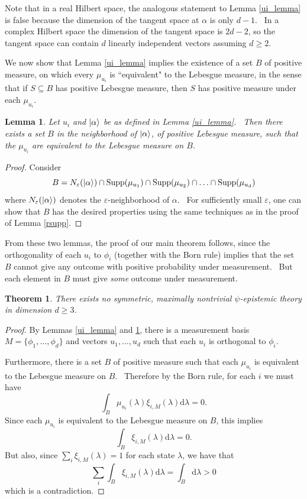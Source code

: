\documentclass[letterpaper,11pt]{article}
\newtheorem{lem}{Lemma}
\newtheorem{thm}{Theorem}
\newcommand{\ket}[1]{\mbox{$ | #1 \rangle $}}
\DeclareMathOperator{\supp}{Supp}
\begin{document}
Note that in a real Hilbert space, the analogous statement to Lemma \ref{ui_lemma} is false because the dimension of the tangent space at $\alpha$ is only $d-1$. \ In a complex Hilbert space the dimension of the tangent space is $2d-2$, so the tangent space can contain $d$ linearly independent vectors assuming $d\geq 2$.

We now show that Lemma \ref{ui_lemma} implies the existence of a set $B$ of positive measure, on which every $\mu_{u_i}$ is ``equivalent" to the Lebesgue measure, in the sense that if $S\subseteq B$ has positive Lebesgue measure, then $S$ has positive measure under each $\mu_{u_i}$.

\begin{lem}
\label{lem_product_measure}
Let $u_i$ and $\ket{\alpha}$ be as defined in Lemma \ref{ui_lemma}. \ Then there exists a set $B$ in the neighborhood of $\ket{\alpha}$, of positive Lebesgue measure, such that the $\mu_{u_i}$ are equivalent to the Lebesgue measure on $B$.
\end{lem}
\begin{proof}
Consider
\[
B= N_{\varepsilon}(\ket{\alpha}) \cap  \supp(\mu_{u_1}) \cap \supp(\mu_{u_2}) \cap \ldots \cap \supp(\mu_{u_d})
\]
where $N_{\varepsilon}(\ket{\alpha})$ denotes the $\varepsilon$-neighborhood of $\alpha$. \ For sufficiently small $\varepsilon$, one can show that $B$ has the desired properties using the same techniques as in the proof of Lemma \ref{rsupp}.
\end{proof}


From these two lemmas, the proof of our main theorem follows, since the orthogonality of each $u_i$ to $\phi_i$ (together with the Born rule) implies that the set $B$ cannot give any outcome with positive probability under measurement. \ But each element in $B$ must give \textit{some} outcome under measurement.

\begin{thm}
\label{main_thm}
There exists no symmetric, maximally nontrivial $\psi$-epistemic theory in
dimension $d\geq 3$.
\end{thm}
\begin{proof}
By Lemmas \ref{ui_lemma} and \ref{lem_product_measure}, there is a measurement basis $M=\{\phi_1,\ldots,\phi_d\}$ and vectors $u_1, \ldots, u_d$ such that each $u_i$ is orthogonal to $\phi_i$.

Furthermore, there is a set $B$ of positive measure such that each $\mu_{u_i}$ is equivalent to the Lebesgue measure on $B$. \ Therefore by the Born rule, for each $i$ we must have
\[
\int_B \mu_{u_i}(\lambda)\xi_{i,M}(\lambda) \mathrm{d}\lambda =0.
\]
Since each $\mu_{u_i}$ is equivalent to the Lebesgue measure on $B$, this implies
\[
\int_B \xi_{i,M}(\lambda) \mathrm{d}\lambda =0.
\]
But also, since $\sum_i \xi_{i,M}(\lambda) = 1$ for each state $\lambda$, we have that
\[
\displaystyle\sum_i \int_B \xi_{i,M}(\lambda) \mathrm{d}\lambda =  \int_B \mathrm{d}\lambda>0
\]
which is a contradiction. \qedhere

\end{proof}
\end{document}
